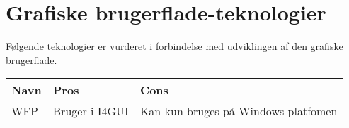 \section{Grafiske brugerflade-teknologier}

Følgende teknologier er vurderet i forbindelse med udviklingen af den grafiske brugerflade.

\begin{tabular}{|l|l|l|}
\hline 
\textbf{Navn} & \textbf{Pros} & \textbf{Cons} \\ 
\hline 
WFP & Bruger i I4GUI & Kan kun bruges på Windows-platfomen\\
\hline
\end{tabular} 
